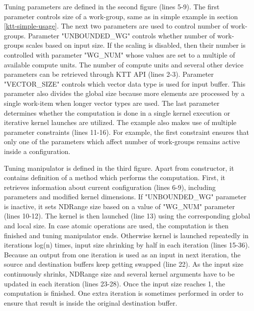 \documentclass
[
    digital, %
    oneside, %
    table, %
    nolof, %
    nolot, %
    nocover %
]{fithesis3}
\begin{document}
Tuning parameters are defined in the second figure (lines 5-9). The first parameter controls size of a work-group, same as in simple example in
section \ref{ktt-simple-usage}. The next two parameters are used to control number of work-groups. Parameter "UNBOUNDED\_WG" controls whether number
of work-groups scales based on input size. If the scaling is disabled, then their number is controlled with parameter "WG\_NUM" whose values are set
to a multiple of available compute units. The number of compute units and several other device parameters can be retrieved through KTT API
(lines 2-3). Parameter "VECTOR\_SIZE" controls which vector data type is used for input buffer. This parameter also divides the global size because
more elements are processed by a single work-item when longer vector types are used. The last parameter determines whether the computation is done
in a single kernel execution or iterative kernel launches are utilized. The example also makes use of multiple parameter constraints (lines 11-16).
For example, the first constraint ensures that only one of the parameters which affect number of work-groups remains active inside a configuration.

Tuning manipulator is defined in the third figure. Apart from constructor, it contains definition of a method which performs the computation. First,
it retrieves information about current configuration (lines 6-9), including parameters and modified kernel dimensions. If "UNBOUNDED\_WG" parameter
is inactive, it sets NDRange size based on a value of "WG\_NUM" parameter (lines 10-12). The kernel is then launched (line 13) using the corresponding
global and local size. In case atomic operations are used, the computation is then finished and tuning manipulator ends. Otherwise kernel is launched
repeatedly in iterations log(n) times, input size shrinking by half in each iteration (lines 15-36). Because an output from one iteration is used as
an input in next iteration, the source and destination buffers keep getting swapped (line 22). As the input size continuously shrinks, NDRange size
and several kernel arguments have to be updated in each iteration (lines 23-28). Once the input size reaches 1, the computation is finished. One extra
iteration is sometimes performed in order to ensure that result is inside the original destination buffer.
\end{document}
